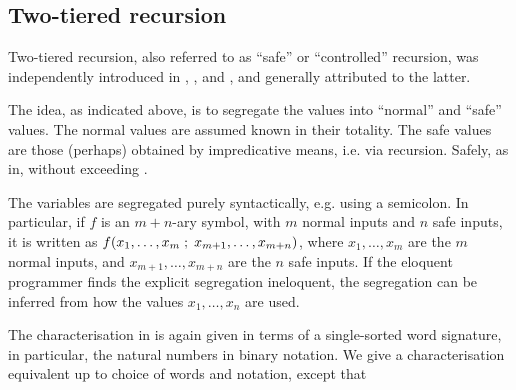 






\subsection{Two-tiered recursion}

Two-tiered recursion, also referred to as ``safe'' or ``controlled'' recursion,
was independently introduced in \cite{simmons-1988}, \cite{leivant-1990}, and
\cite{bellantoni-cook-1992}, and generally attributed to the latter.

The idea, as indicated above, is to segregate the values into ``normal'' and
``safe'' values. The normal values are assumed known in their totality. The
safe values are those (perhaps) obtained by impredicative means, i.e. via
recursion\cite{bellantoni-cook-1992, clote-1999}. Safely, as in, without
exceeding \FPTIME{}.

The variables are segregated purely syntactically, e.g. using a semicolon. In
particular, if $f$ is an $m+n$-ary symbol, with $m$ normal inputs and $n$ safe
inputs, it is written as $f{\mathopen{}\left({x_1,\ldots,x_m \mathrel{};\mathrel{}{} x_{m+1},\ldots,x_{m+n}}\right)\mathclose{}}$,
where $x_1,\ldots,x_m$ are the $m$ normal inputs, and $x_{m+1},\ldots,x_{m+n}$
are the $n$ safe inputs. If the eloquent programmer finds the explicit
segregation ineloquent, the segregation can be inferred from how the values
$x_1,\ldots,x_n$ are used\cite{caseiro-1996}.

The characterisation in \cite{bellantoni-cook-1992} is again given in terms of
a single-sorted word signature, in particular, the natural numbers in binary
notation. We give a characterisation equivalent up to choice of words and
notation, except that

